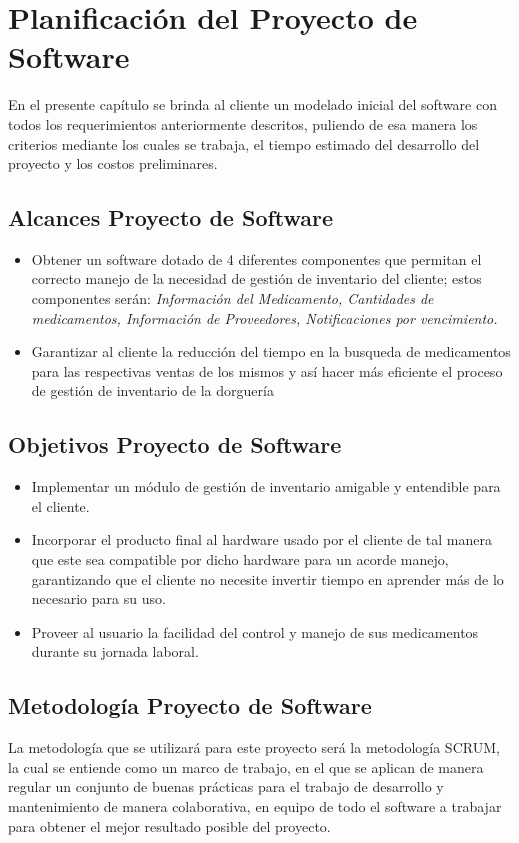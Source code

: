 \chapter{Planificaci\'on del Proyecto de Software}
En el presente cap\'itulo se brinda al cliente un modelado inicial del software con todos los requerimientos anteriormente descritos, puliendo de esa manera los criterios mediante los cuales se trabaja, el tiempo estimado del desarrollo del proyecto y los costos preliminares.

\section{Alcances Proyecto de Software}
\begin{itemize}
	\item Obtener un software dotado de 4 diferentes componentes que permitan el correcto manejo de la necesidad de gesti\'on de inventario del cliente; estos componentes ser\'an: \textit{Informaci\'on del Medicamento, Cantidades de medicamentos, Informaci\'on de Proveedores, Notificaciones por vencimiento.}
	\item Garantizar al cliente la reducci\'on del tiempo en la busqueda de medicamentos para las respectivas ventas de los mismos y as\'i hacer m\'as eficiente el proceso de gesti\'on de inventario de la dorguer\'ia 
\end{itemize}
\newpage
\section{Objetivos Proyecto de Software}
\begin{itemize}
	\item Implementar un m\'odulo de gesti\'on de inventario amigable y entendible para el cliente.
	\item Incorporar el producto final al hardware usado por el cliente de tal manera que este sea compatible por dicho hardware para un acorde manejo, garantizando que el cliente no necesite invertir tiempo en aprender m\'as de lo necesario para su uso.
	\item Proveer al usuario la facilidad del control y manejo de sus medicamentos durante su jornada laboral.
\end{itemize}
\section{Metodolog\'ia Proyecto de Software}
La metodolog\'ia que se utilizar\'a para este proyecto ser\'a la metodolog\'ia SCRUM, la cual se entiende como un marco de trabajo, en el que se aplican de manera regular un conjunto de buenas pr\'acticas para el trabajo de desarrollo y mantenimiento de manera colaborativa, en equipo de todo el software a trabajar para obtener el mejor resultado posible del proyecto.\\

